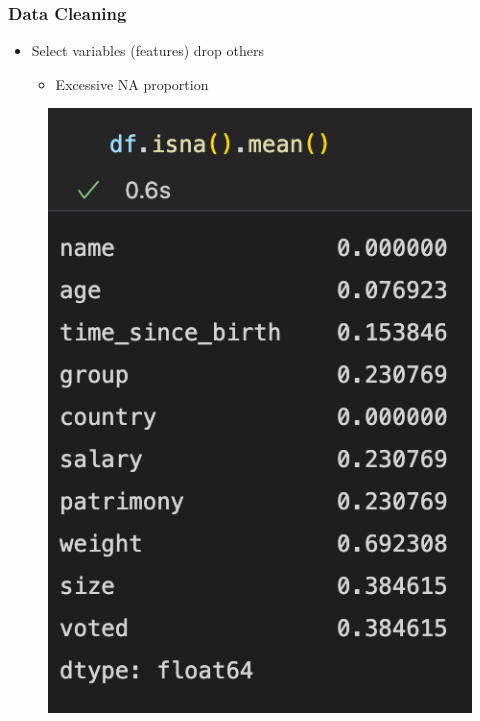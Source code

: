 \begin{frame}\frametitle{Data Cleaning}
   \begin{itemize}
      \item Select variables (features) drop others
      \begin{itemize}
         \item Excessive NA proportion
      \end{itemize}
   \end{itemize}
   \vspace{.5cm}
   \begin{minipage}{0.38\linewidth}
      \begin{figure}[H]
         \includegraphics[scale=.35]{../images/illustrations/data_cleaning_detect_columns_na_proportion.png}
      \end{figure}
   \end{minipage}
   \begin{minipage}{0.58\linewidth}
      \begin{figure}[H]

\end{figure}
\end{minipage}
\end{frame}
